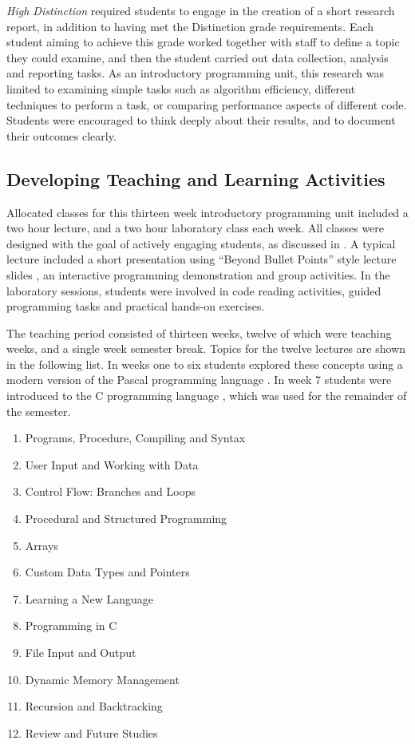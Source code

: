 \emph{High Distinction} required students to engage in the creation of a short research report, in addition to having met the Distinction grade requirements. Each student aiming to achieve this grade worked together with staff to define a topic they could examine, and then the student carried out data collection, analysis and reporting tasks. As an introductory programming unit, this research was limited to examining simple tasks such as algorithm efficiency, different techniques to perform a task, or comparing performance aspects of different code. Students were encouraged to think deeply about their results, and to document their outcomes clearly.


\subsection{Developing Teaching and Learning Activities} %
\label{sub:intro_developing_teaching_and_learning_activities}



Allocated classes for this thirteen week introductory programming unit included a two hour lecture, and a two hour laboratory class each week. All classes were designed with the goal of actively engaging students, as discussed in . A typical lecture included a short presentation using ``Beyond Bullet Points'' style lecture slides \cite{Atkinson:2007}, an interactive programming demonstration and group activities. In the laboratory sessions, students were involved in code reading activities, guided programming tasks and practical hands-on exercises.

The teaching period consisted of thirteen weeks, twelve of which were teaching weeks, and a single week semester break. Topics for the twelve lectures are shown in the following list. In weeks one to six students explored these concepts using a modern version of the Pascal programming language \cite{Wirth:1971,FPC:2011}. In week 7 students were introduced to the C programming language \cite{Ritchie:1978}, which was used for the remainder of the semester. 

\begin{enumerate}
  \item Programs, Procedure, Compiling and Syntax
  \item User Input and Working with Data
  \item Control Flow: Branches and Loops
  \item Procedural and Structured Programming
  \item Arrays
  \item Custom Data Types and Pointers
  \item Learning a New Language
  \item Programming in C
  \item File Input and Output
  \item Dynamic Memory Management
  \item Recursion and Backtracking
  \item Review and Future Studies
\end{enumerate}

